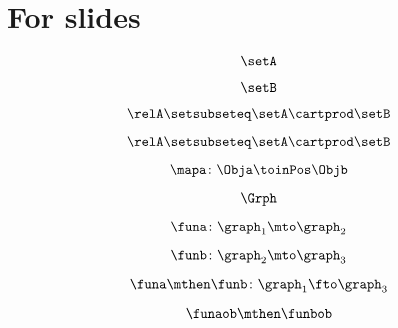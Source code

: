 
\section[For slides]{For slides}

\begin{forslides}

    \begin{equation}
        \label{eq:cats-of-structures-00}
        \setA
    \end{equation}

    \begin{equation}
        \label{eq:cats-of-structures-01}
        \setB
    \end{equation}

    \begin{equation}
        \label{eq:cats-of-structures-02}
        \relA \setsubseteq \setA \cartprod \setB
    \end{equation}

    \begin{equation}
        \label{eq:cats-of-structures-03}
        \relA \setsubseteq \setA \cartprod \setB
    \end{equation}

    \begin{equation}
        \label{eq:cats-of-structures-04}
        \mapa \colon \Obja \toinPos \Objb
    \end{equation}

    \begin{equation}
        \label{eq:cats-of-structures-05}
        \Grph
    \end{equation}

    \begin{equation}
        \label{eq:cats-of-structures-06}
        \funa\colon \graph_1\mto \graph_2
    \end{equation}

    \begin{equation}
        \label{eq:cats-of-structures-07}
        \funb\colon \graph_2\mto \graph_3
    \end{equation}

    \begin{equation}
        \label{eq:cats-of-structures-08}
        \funa\mthen \funb \colon \graph_1 \fto \graph_3
    \end{equation}

    \begin{equation}
        \label{eq:cats-of-structures-09}
        \funaob \mthen \funbob
    \end{equation}


\end{forslides}
